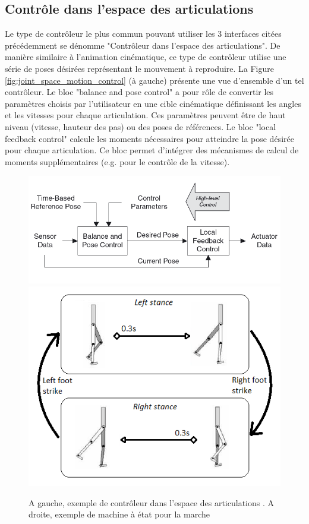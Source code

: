 \documentclass[runningheads,a4paper]{llncs}
\begin{document}
\subsection{Contrôle dans l'espace des articulations} 
Le type de contrôleur le plus commun pouvant utiliser les 3 interfaces citées précédemment se dénomme "Contrôleur dans l'espace des articulations".
De manière similaire à l'animation cinématique, ce type de contrôleur utilise une série de poses désirées représentant le mouvement à reproduire. La Figure \ref{fig:joint_space_motion_control} (à gauche) présente une vue d'ensemble d'un tel contrôleur. Le bloc "balance and pose control" a pour rôle de convertir les paramètres choisis par l'utilisateur en une cible cinématique définissant les angles et les vitesses pour chaque articulation. Ces paramètres peuvent être de haut niveau (vitesse, hauteur des pas) ou des poses de références. Le bloc "local feedback control" calcule les moments nécessaires pour atteindre la pose désirée pour chaque articulation. Ce bloc permet d'intégrer des mécanismes de calcul de moments supplémentaires (e.g. pour le contrôle de la vitesse). 
\begin{figure}[h]
\centering
\includegraphics[scale=0.4]{joint_space_motion_control.png}
\includegraphics[scale=0.5]{state_machine.png}
\caption{A gauche, exemple de contrôleur dans l'espace des articulations \cite{geijtenbeek2012interactive}. A droite, exemple de machine à état pour la marche \cite{yin2007simbicon}}
\label{fig:joint_space_motion_control}
\label{fig:state_machine}
\end{figure}
\end{document}
